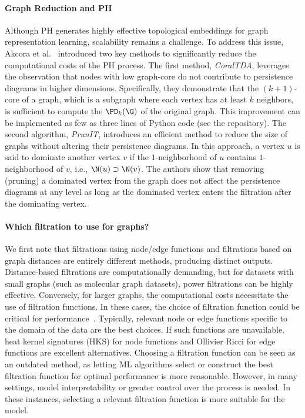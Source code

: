 \paragraph*{Graph Reduction and PH} Although PH generates highly effective topological embeddings for graph representation learning, scalability remains a challenge. To address this issue, Akcora et al.~\cite{akcora2022reduction} introduced two key methods to significantly reduce the computational costs of the PH process. The first method, \textit{CoralTDA}, leverages the observation that nodes with low graph-core do not contribute to persistence diagrams in higher dimensions. Specifically, they demonstrate that the $(k+1)$-core of a graph, which is a subgraph where each vertex has at least $k$ neighbors, is sufficient to compute the $\PD_k(\G)$ of the original graph. This improvement can be implemented as few as three lines of Python code (see the repository).  The second algorithm, \textit{PrunIT}, introduces an efficient method to reduce the size of graphs without altering their persistence diagrams. In this approach, a vertex \( u \) is said to dominate another vertex \( v \) if the $1$-neighborhood of $u$ contains $1$-neighborhood of $v$, i.e., $\N(u)\supset \N(v)$. The authors show that removing (pruning) a dominated vertex from the graph does not affect the persistence diagrams at any level as long as the dominated vertex enters the filtration after the dominating vertex.


\paragraph*{Which filtration to use for graphs?} We first note that filtrations using node/edge functions and filtrations based on graph distances are entirely different methods, producing distinct outputs. Distance-based filtrations are computationally demanding, but for datasets with small graphs (such as molecular graph datasets), power filtrations can be highly effective. Conversely, for larger graphs, the computational costs necessitate the use of filtration functions. In these cases, the choice of filtration function could be critical for performance~\cite{cai2020understanding}. Typically, relevant node or edge functions specific to the domain of the data are the best choices. If such functions are unavailable, heat kernel signatures (HKS) for node functions and Ollivier Ricci for edge functions are excellent alternatives. Choosing a filtration function can be seen as an outdated method, as letting ML algorithms select or construct the best filtration function for optimal performance is more reasonable. However, in many settings, model interpretability or greater control over the process is needed. In these instances, selecting a relevant filtration function is more suitable for the model.

